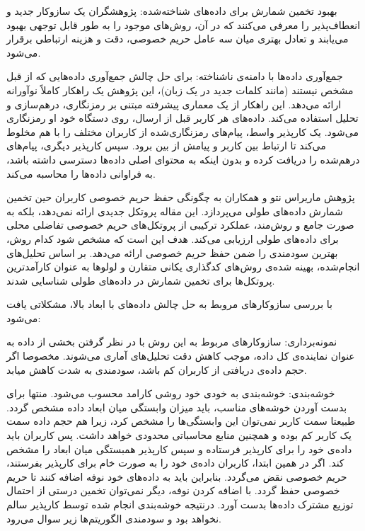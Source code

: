 
 بهبود تخمین شمارش برای داده‌های شناخته‌شده: پژوهشگران یک سازوکار جدید و انعطاف‌پذیر را معرفی می‌کنند که در آن، روش‌های موجود را به طور قابل توجهی بهبود می‌یابند و تعادل بهتری میان سه عامل حریم خصوصی، دقت و هزینه ارتباطی برقرار می‌شود.

 جمع‌آوری داده‌ها با دامنه‌ی ناشناخته: برای حل چالش جمع‌آوری داده‌هایی که از قبل مشخص نیستند (مانند کلمات جدید در یک زبان)، این پژوهش یک راهکار کاملاً نوآورانه ارائه می‌دهد. این راهکار از یک معماری پیشرفته مبتنی بر رمزنگاری، درهم‌سازی و تحلیل  استفاده می‌کند. داده‌های هر کاربر قبل از ارسال، روی دستگاه خود او رمزنگاری می‌شود. یک کارپذیر واسط، پیام‌های رمزنگاری‌شده از کاربران مختلف را با هم مخلوط می‌کند تا ارتباط بین کاربر و پیامش از بین برود. سپس کارپذیر دیگری، پیام‌های درهم‌شده را دریافت کرده و بدون اینکه به محتوای اصلی داده‌ها دسترسی داشته باشد، به فراوانی داده‌ها را محاسبه می‌کند.




پژوهش ماریراس نتو و همکاران  به چگونگی حفظ حریم خصوصی کاربران حین تخمین شمارش داده‌های طولی می‌پردازد. این مقاله پروتکل جدیدی ارائه نمی‌دهد، بلکه به صورت جامع و روش‌مند، عملکرد ترکیبی از پروتکل‌های حریم خصوصی تفاضلی محلی برای داده‌های طولی ارزیابی می‌کند. هدف این است که مشخص شود کدام روش، بهترین سودمندی را ضمن حفظ حریم خصوصی ارائه می‌دهد. بر اساس تحلیل‌های انجام‌شده، بهینه شده‌ی روش‌های کدگذاری یکانی متقارن و لولوها به عنوان کارآمدترین پروتکل‌ها برای تخمین شمارش در داده‌های طولی شناسایی شدند.


با بررسی سازوکارهای مروبط به حل چالش داده‌های با ابعاد بالا، مشکلاتی یافت می‌شود:


 نمونه‌برداری: سازوکارهای مربوط به این روش با در نظر گرفتن بخشی از داده به عنوان نماینده‌ی کل داده، موجب کاهش دقت تحلیل‌های آماری می‌شوند. مخصوصا اگر حجم داده‌ی دریافتی از کاربران کم باشد، سودمندی به شدت کاهش میابد.

 خوشه‌بندی: خوشه‌بندی به خودی خود روشی کارامد محسوب می‌شود. منتها برای بدست آوردن خوشه‌های مناسب، باید میزان وابستگی میان ابعاد داده مشخص گردد. طبیعتا سمت کاربر نمی‌توان این وابستگی‌ها را مشخص کرد، زیرا هم حجم داده سمت یک کاربر کم بوده و همچنین منابع محاسباتی محدودی خواهد داشت. پس کاربران باید داده‌ی خود را برای کارپذیر فرستاده و سپس کارپذیر همبستگی میان ابعاد را مشخص کند. اگر در همین ابتدا، کاربران داده‌ی خود را به صورت خام برای کارپذیر بفرستند، حریم خصوصی نقض می‌گردد. بنابراین باید به داده‌های خود نوفه اضافه کنند تا حریم خصوصی حفظ گردد. با اضافه کردن نوفه، دیگر نمی‌توان تخمین درستی از احتمال توزیع مشترک داده‌ها بدست آورد. درنتیجه خوشه‌بندی انجام شده توسط کارپذیر سالم نخواهد بود و سودمندی الگوریتم‌ها زیر سوال می‌رود.

